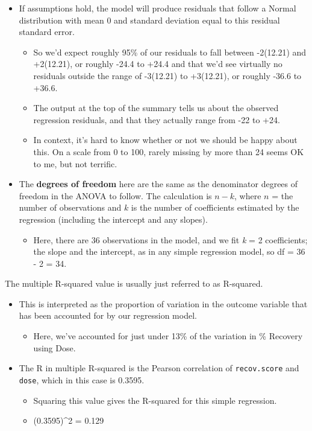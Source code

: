 \documentclass[
]{book}
\providecommand{\tightlist}{%
  \setlength{\itemsep}{0pt}\setlength{\parskip}{0pt}}
\begin{document}
\begin{itemize}
\tightlist
\item
  If assumptions hold, the model will produce residuals that follow a Normal distribution with mean 0 and standard deviation equal to this residual standard error.

  \begin{itemize}
  \tightlist
  \item
    So we'd expect roughly 95\% of our residuals to fall between -2(12.21) and +2(12.21), or roughly -24.4 to +24.4 and that we'd see virtually no residuals outside the range of -3(12.21) to +3(12.21), or roughly -36.6 to +36.6.
  \item
    The output at the top of the summary tells us about the observed regression residuals, and that they actually range from -22 to +24.
  \item
    In context, it's hard to know whether or not we should be happy about this. On a scale from 0 to 100, rarely missing by more than 24 seems OK to me, but not terrific.
  \end{itemize}
\item
  The \textbf{degrees of freedom} here are the same as the denominator degrees of freedom in the ANOVA to follow. The calculation is \(n - k\), where \(n\) = the number of observations and \(k\) is the number of coefficients estimated by the regression (including the intercept and any slopes).

  \begin{itemize}
  \tightlist
  \item
    Here, there are 36 observations in the model, and we fit \emph{k} = 2 coefficients; the slope and the intercept, as in any simple regression model, so df = 36 - 2 = 34.
  \end{itemize}
\end{itemize}

The multiple R-squared value is usually just referred to as R-squared.

\begin{itemize}
\tightlist
\item
  This is interpreted as the proportion of variation in the outcome variable that has been accounted for by our regression model.

  \begin{itemize}
  \tightlist
  \item
    Here, we've accounted for just under 13\% of the variation in \% Recovery using Dose.
  \end{itemize}
\item
  The R in multiple R-squared is the Pearson correlation of \texttt{recov.score} and \texttt{dose}, which in this case is 0.3595.

  \begin{itemize}
  \tightlist
  \item
    Squaring this value gives the R-squared for this simple regression.
  \item
    (0.3595)\^{}2 = 0.129
  \end{itemize}
\end{itemize}
\end{document}

